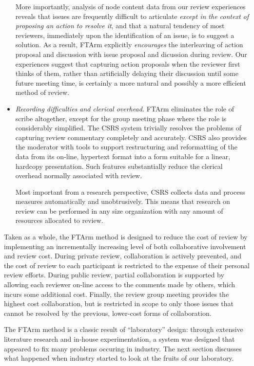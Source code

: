 \begin{itemize}
  More importantly, analysis of node content data from our review
  experiences reveals that issues are frequently difficult to articulate
  {\em except in the context of proposing an action to resolve it}, and
  that a natural tendency of most reviewers, immediately upon the
  identification of an issue, is to suggest a solution.  As a result,
  FTArm explicitly {\em encourages} the interleaving of action proposal
  and discussion with issue proposal and dicussion during review.  Our
  experiences suggest that capturing action proposals when the reviewer
  first thinks of them, rather than artificially delaying their
  discussion until some future meeting time, is certainly a more natural
  and possibly a more efficient method of review.
  
\item {\em Recording difficulties and clerical overhead.} FTArm
  eliminates the role of scribe altogether, except for the group meeting
  phase where the role is considerably simplified.  The CSRS system
  trivially resolves the problems of capturing review commentary completely
  and accurately.  CSRS also provides the moderator with tools to support
  restructuring and reformatting of the data from its on-line, hypertext
  format into a form suitable for a linear, hardcopy presentation.  Such
  features substantially reduce the clerical overhead normally associated
  with review.
 
  Most important from a research perspective, CSRS collects data and
  process measures automatically and unobtrusively.  This means that
  research on review can be performed in any size organization with any
  amount of resources allocated to review.

\end{itemize}

Taken as a whole, the FTArm method is designed to reduce the cost of review
by implementing an incrementally increasing level of both collaborative
involvement and review cost.  During private review, collaboration is
actively prevented, and the cost of review to each participant is
restricted to the expense of their personal review efforts.  During public
review, partial collaboration is supported by allowing each reviewer
on-line access to the comments made by others, which incurs some additional
cost.  Finally, the review group meeting provides the highest cost
collaboration, but is restricted in scope to only those issues that cannot
be resolved by the previous, lower-cost forms of collaboration.

The FTArm method is a classic result of ``laboratory'' design: through 
extensive literature research and in-house experimentation, a system was
designed that appeared to fix many problems occuring in industry.
The next section discusses what happened when industry started to look at
the fruits of our laboratory.


